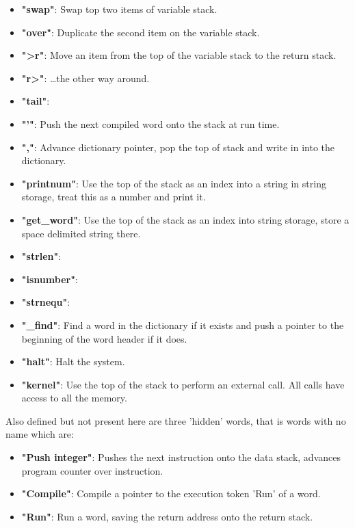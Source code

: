 \documentclass	[a4paper, 10pt]	{article}
\begin{document}
\begin{itemize}
        \item \textbf{"swap"}: Swap top two items of variable stack.
        \item \textbf{"over"}: Duplicate the second item on the variable stack. 
        \item \textbf{">r"}: Move an item from the top of the variable
        stack to the return stack.
        \item \textbf{"r>"}: \ldots the other way around.
        \item \textbf{"tail"}: 
        \item \textbf{"'"}: Push the next compiled word onto the stack at
        run time.
        \item \textbf{","}: Advance dictionary pointer, pop the top of stack
        and write in into the dictionary.
        \item \textbf{"printnum"}: Use the top of the stack as an index into
        a string in string storage, treat this as a number and print it.
        \item \textbf{"get\_word"}: Use the top of the stack as an index into
        string storage, store a space delimited string there.
        \item \textbf{"strlen"}:
        \item \textbf{"isnumber"}:
        \item \textbf{"strnequ"}:
        \item \textbf{"\_find"}: Find a word in the dictionary if it
        exists and push a pointer to the beginning of the word header if
        it does.
        \item \textbf{"halt"}: Halt the system.
        \item \textbf{"kernel"}: Use the top of the stack to perform an
        external call. All calls have access to all the memory.
      \end{itemize}

      Also defined but not present here are three 'hidden' words, that is
      words with no name which are:

      \begin{itemize}
        \item \textbf{"Push integer"}: Pushes the next instruction onto the
        data stack, advances program counter over instruction.
        \item \textbf{"Compile"}: Compile a pointer to the execution token
        'Run' of a word.
        \item \textbf{"Run"}: Run a word, saving the return address onto the
        return stack.
      \end{itemize}
\end{document}
